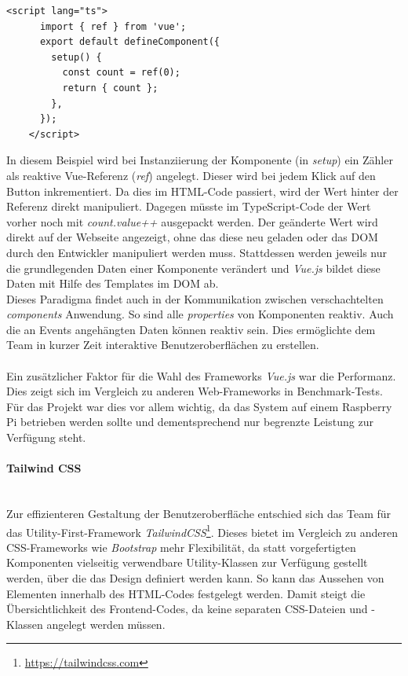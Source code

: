 \documentclass[10pt, a4paper]{article}
\begin{document}
\begin{onehalfspace}
\begin{minipage}{\textwidth}
\begin{lstlisting}[caption={Demonstration reaktivier Vue-Referenzen}, captionpos=b, label=lst:reactivity]
    <script lang="ts">
      import { ref } from 'vue';
      export default defineComponent({
        setup() {
          const count = ref(0);
          return { count };
        },
      });
    </script>
    \end{lstlisting}
  \end{minipage}
  In diesem Beispiel wird bei Instanziierung der Komponente (in \textit{setup}) ein Zähler als reaktive Vue-Referenz (\textit{ref}) angelegt.
  Dieser wird bei jedem Klick auf den Button inkrementiert.
  Da dies im HTML-Code passiert, wird der Wert hinter der Referenz direkt manipuliert.
  Dagegen müsste im TypeScript-Code der Wert vorher noch mit \textit{count.value++} \glqq ausgepackt\grqq{} werden.
  Der geänderte Wert wird direkt auf der Webseite angezeigt,
  ohne das diese neu geladen oder das DOM durch den Entwickler manipuliert werden muss. Stattdessen werden jeweils nur die grundlegenden Daten einer Komponente verändert und \textit{Vue.js} bildet diese Daten mit Hilfe des Templates im DOM ab.
  \\
  Dieses Paradigma findet auch in der Kommunikation zwischen verschachtelten \textit{components} Anwendung.
  So sind alle \textit{properties} von Komponenten reaktiv. Auch die an Events angehängten Daten können reaktiv sein.
  Dies ermöglichte dem Team in kurzer Zeit interaktive Benutzeroberflächen zu erstellen.

  \paragraph*{}
  Ein zusätzlicher Faktor für die Wahl des Frameworks \textit{Vue.js} war die Performanz.
  Dies zeigt sich im Vergleich zu anderen Web-Frameworks in Benchmark-Tests.\cite{Vue_Performance}
  Für das Projekt war dies vor allem wichtig, da das System auf einem Raspberry Pi betrieben werden sollte
  und dementsprechend nur begrenzte Leistung zur Verfügung steht.

  \paragraph*{Tailwind CSS} $~$ \\
  Zur effizienteren Gestaltung der Benutzeroberfläche entschied sich das Team für das Utility-First-Framework \textit{TailwindCSS}\footnote{\raggedright\url{https://tailwindcss.com}}.
  Dieses bietet im Vergleich zu anderen CSS-Frameworks wie \textit{Bootstrap} mehr Flexibilität, da statt vorgefertigten Komponenten vielseitig verwendbare Utility-Klassen zur Verfügung gestellt werden,
  über die das Design definiert werden kann. So kann das Aussehen von Elementen innerhalb des HTML-Codes festgelegt werden.
  Damit steigt die Übersichtlichkeit des Frontend-Codes, da keine separaten CSS-Dateien und -Klassen angelegt werden müssen.
  \cite{Tailwind_Vorteile}



\end{onehalfspace}
\end{document}
